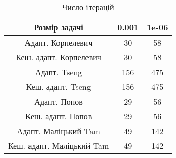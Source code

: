 \begin{table}[H]
	\centering
	\begin{tabular}{|c||c|c|}\hline
		Розмір задачі & 0.001 & 1e-06 \\ \hline \hline
		Адапт. Корпелевич & 30 & 58 \\ \hline
		Кеш. адапт. Корпелевич & 30 & 58 \\ \hline
		Адапт. Tseng & 156 & 475 \\ \hline
		Кеш. адапт. Tseng & 156 & 475 \\ \hline
		Адапт. Попов & 29 & 56 \\ \hline
		Кеш. адапт. Попов & 29 & 56 \\ \hline
		Адапт. Маліцький Tam & 49 & 142 \\ \hline
		Кеш. адапт. Маліцький Tam & 49 & 142 \\ \hline
	\end{tabular}
	\caption{Число ітерацій}
\end{table}

